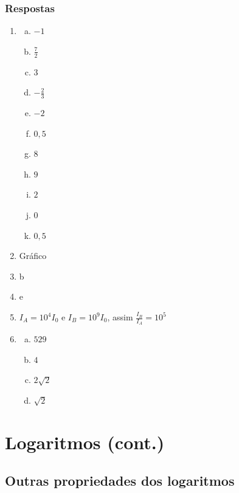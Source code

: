 \subsubsection{Respostas}
\begin{enumerate}[1)]
\item {
\begin{enumerate}[a)]
 \item $-1$
 \item $\frac{7}{2}$
 \item $3$
 \item $-\frac{2}{3}$
 \item $-2$
 \item $0,5$
 \item $8$
 \item $9$
 \item $2$
 \item $0$
 \item $0,5$
\end{enumerate}
}
\item Gráfico
\item b
\item e
\item $I_A = 10^4 I_0$ e $I_B = 10^9 I_0$, assim $\frac{I_B}{I_A}=10^5$
\item { \begin{enumerate}[a)]
\item $529$
\item $4$
\item $2\sqrt{2}$
\item $\sqrt{2}$
\end{enumerate}
}
\end{enumerate}

\terminaexer

\section{Logaritmos (cont.)}
\subsection{Outras propriedades dos logaritmos}


